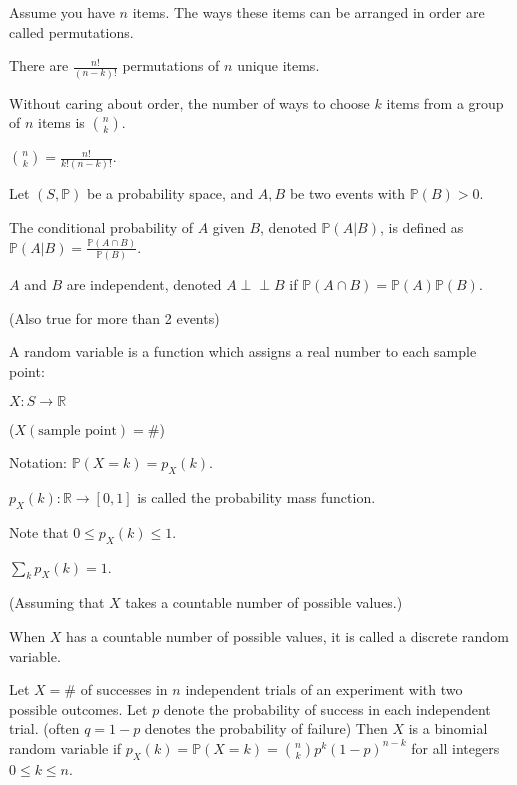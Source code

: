 \documentclass{article}
\newcommand{\indep}{\perp \!\!\! \perp}
\begin{document}
    Assume you have $n$ items. The ways these items can be arranged in order are called permutations.
    
    There are $\frac{n!}{(n-k)!}$ permutations of $n$ unique items.
    
\medskip
{}

    Without caring about order, the number of ways to choose $k$ items from a group of $n$ items is $n \choose k$.

    ${n \choose k} = \frac{n!}{k!(n-k)!}$.

\medskip
{}

    Let $(S,\mathbb P)$ be a probability space, and $A,B$ be two events with $\mathbb P(B) > 0$.
    
    The conditional probability of $A$ given $B$, denoted $\mathbb P(A|B)$, is defined as $\mathbb P(A|B) = \frac {\mathbb P(A \cap B)}{\mathbb P(B)}$.

\newpage
{}

    $A$ and $B$ are independent, denoted $A \indep B$ if $\mathbb P(A \cap B) = \mathbb P(A) \mathbb P(B)$.
    
    (Also true for more than 2 events)

\medskip
{}

    A random variable is a function which assigns a real number to each sample point:
    
        $X:S \to \mathbb R$
        
        ($X(\text{sample point}) = \#$)
        
        Notation: $\mathbb P(X = k) = p_X(k)$.

\medskip
{}

    $p_X(k):\mathbb R \to [0,1]$ is called the probability mass function.
    
    Note that $0 \leq p_X(k) \leq 1$.
    
    $\sum_kp_X(k)=1$.
    
    (Assuming that $X$ takes a countable number of possible values.)
    
    When $X$ has a countable number of possible values, it is called a discrete random variable.
    
\medskip
{}

    Let $X = \#$ of successes in $n$ independent trials of an experiment with two possible outcomes. Let $p$ denote the probability of success in each independent trial. (often $q=1-p$ denotes the probability of failure) Then $X$ is a binomial random variable if $p_X(k) = \mathbb P(X=k) = {n \choose k}p^k(1-p)^{n-k}$ for all integers $0 \leq k \leq n$.
\end{document}
